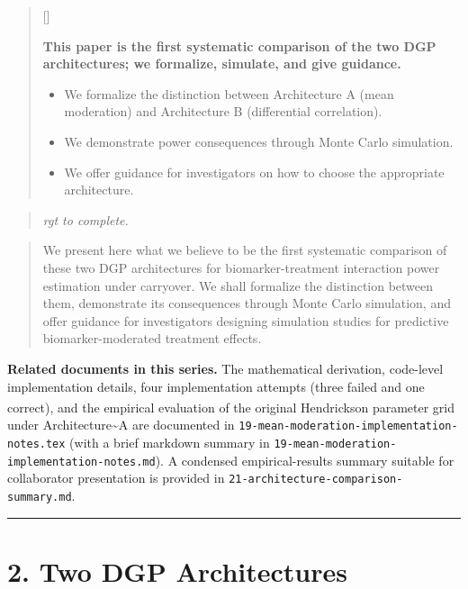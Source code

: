 \documentclass[
  11pt,
]{article}
\newcounter{pgraph}
\newenvironment{bullets}{%
  \stepcounter{pgraph}%
  \begin{quote}\small\sffamily\color[gray]{0.30}%
  {\normalfont\scriptsize\color[gray]{0.58}[\thepgraph]\enspace}}{%
  \end{quote}}
\newenvironment{rgt}{%
  \begin{quote}\small\itshape\color[RGB]{20,60,160}}{%
  \end{quote}}
\newenvironment{orig}{%
  \begin{quote}\normalsize\color[gray]{0.55}}{%
  \end{quote}}
\begin{document}
\begin{bullets}

\textbf{This paper is the first systematic comparison of the
two DGP architectures; we formalize, simulate, and give
guidance.}

\begin{itemize}\setlength{\itemsep}{2pt}\setlength{\parskip}{0pt}
\item We formalize the distinction between Architecture A
  (mean moderation) and Architecture B (differential
  correlation).
\item We demonstrate power consequences through Monte Carlo
  simulation.
\item We offer guidance for investigators on how to choose
  the appropriate architecture.
\end{itemize}

\end{bullets}

\begin{rgt}
rgt to complete.

\end{rgt}

\begin{orig}
We present here what we believe to be the first systematic comparison of
these two DGP architectures for biomarker-treatment interaction power
estimation under carryover. We shall formalize the distinction between
them, demonstrate its consequences through Monte Carlo simulation, and
offer guidance for investigators designing simulation studies for
predictive biomarker-moderated treatment effects.

\end{orig}

\textbf{Related documents in this series.} The mathematical derivation,
code-level implementation details, four implementation attempts (three
failed and one correct), and the empirical evaluation of the original
Hendrickson\textsuperscript{}
parameter grid under Architecture\textasciitilde A are documented in
\texttt{19-mean-moderation-implementation-notes.tex} (with a brief
markdown summary in
\texttt{19-mean-moderation-implementation-notes.md}). A condensed
empirical-results summary suitable for collaborator presentation is
provided in \texttt{21-architecture-comparison-summary.md}.

\bigskip\noindent

\rule{\textwidth}{0.4pt}\bigskip

\section{2. Two DGP Architectures}
\end{document}
